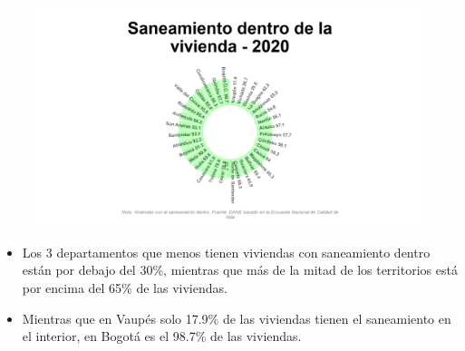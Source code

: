     \begin{figure}[H]
        \caption[Saneamiento dentro de la vivienda por departamentos para 2020 ]{\label{saneamiento_dentro_dptos} }
        \begin{center}
        \includegraphics[width=\textwidth,keepaspectratio]{img/var_193_static.png}
        \end{center}
    \end{figure}
            \begin{itemize}
                    \item Los 3 departamentos que menos tienen viviendas con saneamiento dentro están por debajo del 30\%, mientras que más de la mitad de los territorios está por encima del 65\% de las viviendas.
                    \item Mientras que en Vaupés solo 17.9\% de las viviendas tienen el saneamiento en el interior, en Bogotá es el 98.7\% de las viviendas.
                    \end{itemize}

